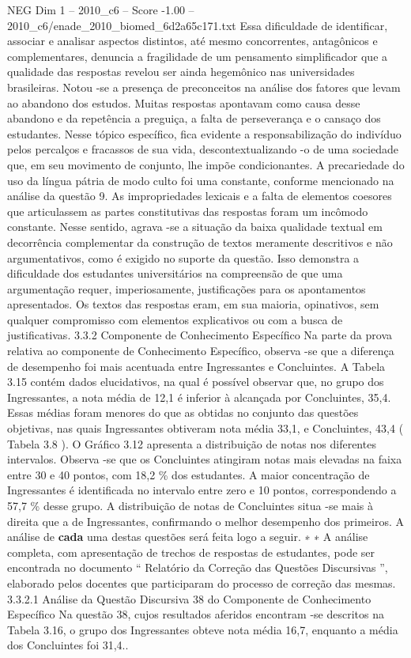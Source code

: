 \begin{textsample}{NEG Dim 1 – 2010\_c6 – Score -1.00 – 2010\_c6/enade\_2010\_biomed\_6d2a65c171.txt}
Essa dificuldade de identificar, associar e analisar aspectos distintos, até mesmo concorrentes, antagônicos e complementares, denuncia a fragilidade de um pensamento simplificador que a qualidade das respostas revelou ser ainda hegemônico nas universidades brasileiras.
Notou -se a presença de preconceitos na análise dos fatores que levam ao abandono dos estudos.
Muitas respostas apontavam como causa desse abandono e da repetência a preguiça, a falta de perseverança e o cansaço dos estudantes.
Nesse tópico específico, fica evidente a responsabilização do indivíduo pelos percalços e fracassos de sua vida, descontextualizando -o de uma sociedade que, em seu movimento de conjunto, lhe impõe condicionantes.
A precariedade do uso da língua pátria de modo culto foi uma constante, conforme mencionado na análise da questão 9.
As impropriedades lexicais e a falta de elementos coesores que articulassem as partes constitutivas das respostas foram um incômodo constante.
Nesse sentido, agrava -se a situação da baixa qualidade textual em decorrência complementar da construção de textos meramente descritivos e não argumentativos, como é exigido no suporte da questão.
Isso demonstra a dificuldade dos estudantes universitários na compreensão de que uma argumentação requer, imperiosamente, justificações para os apontamentos apresentados.
Os textos das respostas eram, em sua maioria, opinativos, sem qualquer compromisso com elementos explicativos ou com a busca de justificativas. 3.3.2 Componente de Conhecimento Específico Na parte da prova relativa ao componente de Conhecimento Específico, observa -se que a diferença de desempenho foi mais acentuada entre Ingressantes e Concluintes.
A Tabela 3.15 contém dados elucidativos, na qual é possível observar que, no grupo dos Ingressantes, a nota média de 12,1 é inferior à alcançada por Concluintes, 35,4.
Essas médias foram menores do que as obtidas no conjunto das questões objetivas, nas quais Ingressantes obtiveram nota média 33,1, e Concluintes, 43,4 ( Tabela 3.8 ).
O Gráfico 3.12 apresenta a distribuição de notas nos diferentes intervalos.
Observa -se que os Concluintes atingiram notas mais elevadas na faixa entre 30 e 40 pontos, com 18,2 \% dos estudantes.
A maior concentração de Ingressantes é identificada no intervalo entre zero e 10 pontos, correspondendo a 57,7 \% desse grupo.
A distribuição de notas de Concluintes situa -se mais à direita que a de Ingressantes, confirmando o melhor desempenho dos primeiros.
A análise de \textbf{cada} uma destas questões será feita logo a seguir. ∗ ∗ A análise completa, com apresentação de trechos de respostas de estudantes, pode ser encontrada no documento “ Relatório da Correção das Questões Discursivas ”, elaborado pelos docentes que participaram do processo de correção das mesmas. 3.3.2.1 Análise da Questão Discursiva 38 do Componente de Conhecimento Específico Na questão 38, cujos resultados aferidos encontram -se descritos na Tabela 3.16, o grupo dos Ingressantes obteve nota média 16,7, enquanto a média dos Concluintes foi 31,4..

\end{textsample}
